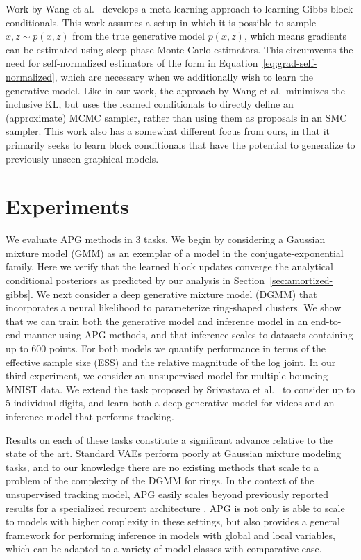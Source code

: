 \documentclass{article}
\theoremstyle{definition}
\begin{document}
Work by Wang et al.~\cite{wang2018meta} develops a meta-learning approach to learning Gibbs block conditionals. This work assumes a setup in which it is possible to sample $x, z \sim p(x, z)$ from the true generative model $p(x,z)$, which means gradients can be estimated using sleep-phase Monte Carlo estimators. This circumvents the need for self-normalized estimators of the form in Equation~\ref{eq:grad-self-normalized}, which are necessary when we additionally wish to learn the generative model. Like in our work, the approach by Wang et al.~minimizes the inclusive KL, but uses the learned conditionals to directly define an (approximate) MCMC sampler, rather than using them as proposals in an SMC sampler. This work also has a somewhat different focus from ours, in that it primarily seeks to learn block conditionals that have the potential to generalize to previously unseen graphical models.




\section{Experiments}
\label{sec:experiments}
We evaluate APG methods in 3 tasks. We begin by considering a Gaussian mixture model (GMM) as an exemplar of a model in the conjugate-exponential family. Here we verify that the learned block updates converge the analytical conditional posteriors as predicted by our analysis in Section~\ref{sec:amortized-gibbs}. We next consider a deep generative mixture model (DGMM) that incorporates a neural likelihood to parameterize ring-shaped clusters. We show that we can train both the generative model and inference model in an end-to-end manner using APG methods, and that inference scales to datasets containing up to 600 points. For both models we quantify performance in terms of the effective sample size (ESS) and the relative magnitude of the log joint. In our third experiment, we consider an unsupervised model for multiple bouncing MNIST data. We extend the task proposed by Srivastava et al.~\cite{srivastava2015unsupervised} to consider up to 5 individual digits, and learn both a deep generative model for videos and an inference model that performs tracking.



Results on each of these tasks constitute a significant advance relative to the state of the art. Standard VAEs perform poorly at Gaussian mixture modeling tasks, and to our knowledge there are no existing methods that scale to a problem of the complexity of the DGMM for rings. In the context of the unsupervised tracking model, APG easily scales beyond previously reported results for a specialized recurrent architecture \cite{kosiorek2018sequential}. APG is not only is able to scale to models with higher complexity in these settings, but also provides a general framework for performing inference in models with global and local variables, which can be adapted to a variety of model classes with comparative ease.
\end{document}

